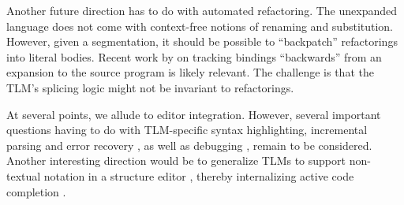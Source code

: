 \documentclass[acmsmall,screen]{acmart}
\begin{document}

Another future direction has to do with automated refactoring. The unexpanded language does not come with context-free notions of renaming and substitution. However, given a segmentation, it should be possible to ``backpatch'' refactorings into literal bodies. Recent work by \citet{wand2017inferring} on tracking bindings ``backwards'' from an expansion to the source program is likely relevant. The challenge is that the TLM's splicing logic might not be invariant to refactorings.

At several points, we allude to editor integration. However, several important questions having to do with TLM-specific syntax highlighting, incremental parsing and error recovery \cite{graham1979practical}, as well as debugging \cite{DBLP:journals/scp/CulpepperF10}, remain to be considered. Another interesting direction would be to generalize TLMs to support non-textual notation in a structure editor \cite{DBLP:conf/popl/OmarVHAH17,snapl17}, thereby internalizing active code completion \cite{Omar:2012:ACC:2337223.2337324}.

\end{document}

